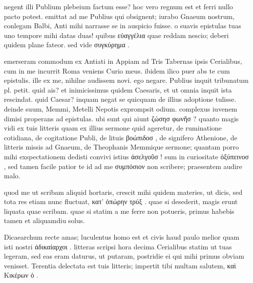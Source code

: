 


 negent illi Publium plebeium factum esse? hoc vero regnum est et ferri nullo pacto potest. emittat ad me Publius qui obsignent; iurabo Gnaeum nostrum, conlegam Balbi, Anti mihi narrasse se in auspicio fuisse. o suavis epistulas tuas uno tempore mihi datas duas! quibus εὐαγγέλια quae reddam nescio; deberi quidem plane fateor. sed vide συγκύρημα .

 emerseram commodum ex Antiati in Appiam ad Tris Tabernas ipsis Cerialibus, cum in me incurrit Roma veniens Curio meus. ibidem ilico puer abs te cum epistulis. ille ex me, nihilne audissem novi. ego negare. Publius inquit tribunatum pl. petit. quid ais? et inimicissimus quidem Caesaris, et ut omnia inquit ista rescindat. quid Caesar? inquam negat se quicquam de illius adoptione tulisse. deinde suum, Memmi, Metelli Nepotis exprompsit odium. complexus iuvenem dimisi properans ad epistulas. ubi sunt qui aiunt ζώσησ φωνῆσ ? quanto magis vidi ex tuis litteris quam ex illius sermone quid ageretur, de ruminatione cotidiana, de cogitatione Publi, de lituis βοώπιδοσ , de signifero Athenione, de litteris missis ad Gnaeum, de Theophanis Memmique sermone; quantam porro mihi exspectationem dedisti convivi istius ἀσελγοῦσ ! sum in curiositate ὀξύπεινοσ , sed tamen facile patior te id ad me συμπόσιον non scribere; praesentem audire malo.

 quod me ut scribam aliquid hortaris, crescit mihi quidem materies, ut dicis, sed tota res etiam nunc fluctuat, κατ' ὀπώρην τρύξ . quae si desederit, magis erunt liquata quae scribam. quae si statim a me ferre non potueris, primus habebis tamen et aliquamdiu solus.

 Dicaearchum recte amas; luculentus homo est et civis haud paulo melior quam isti nostri ἀδικαίαρχοι . litteras scripsi hora decima Cerialibus statim ut tuas legeram, sed eas eram daturus, ut putaram, postridie ei qui mihi primus obviam venisset. Terentia delectata est tuis litteris; impertit tibi multam salutem, καὶ Κικέρων ὁ .
